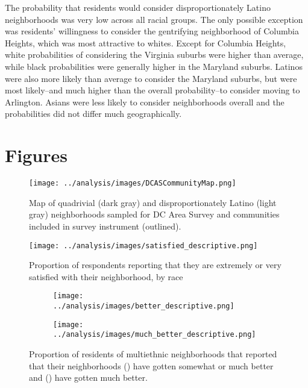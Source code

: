 \documentclass[11pt]{baderart}
\begin{document}
The probability that residents would consider disproportionately Latino neighborhoods was very low across all racial groups. The only possible exception was residents'  willingness to consider the gentrifying neighborhood of Columbia Heights, which was most attractive to whites. Except for Columbia Heights, white probabilities of considering the Virginia suburbs were higher than average, while black probabilities were generally higher in the Maryland suburbs. Latinos were also more likely than average to consider the Maryland suburbs, but were most likely--and much higher than the overall probability--to consider moving to Arlington. Asians were less likely to consider neighborhoods overall and the probabilities did not differ much geographically. 










\clearpage



\clearpage
\section{Figures}
\begin{figure}
\texttt{[image: ../analysis/images/DCASCommunityMap.png]}
\caption{Map of quadrivial (dark gray) and disproportionately Latino (light gray) neighborhoods sampled for DC Area Survey and communities included in survey instrument (outlined).}
\label{fig:map}
\end{figure}

\begin{figure}[ht!]
\centering
\texttt{[image: ../analysis/images/satisfied\_descriptive.png]}
\caption{Proportion of respondents reporting that they are extremely or very satisfied with their neighborhood, by race}
\label{fig:satisfaction}
\end{figure}

\begin{sidewaysfigure}
\begin{subfigure}{.49\textwidth}
\texttt{[image: ../analysis/images/better\_descriptive.png]}
\caption{}
\label{subfig:better}
\end{subfigure}\quad\begin{subfigure}{.49\textwidth}
\texttt{[image: ../analysis/images/much\_better\_descriptive.png]}
\caption{}
\label{subfig:muchbetter}
\end{subfigure}
\caption{Proportion of residents of multiethnic neighborhoods that reported that their neighborhoods () have gotten somewhat or much better and () have gotten much better.}
\label{fig:improvement}
\end{sidewaysfigure}
\end{document}
